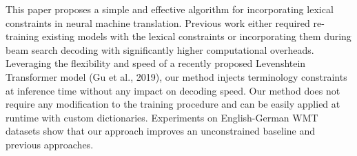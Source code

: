 This paper proposes a simple and effective algorithm for incorporating lexical constraints in neural machine translation. Previous work either required re-training existing models with the lexical constraints or incorporating them during beam search decoding with significantly higher computational overheads. Leveraging the flexibility and speed of a recently proposed Levenshtein Transformer model (Gu et al., 2019), our method injects terminology constraints at inference time without any impact on decoding speed. Our method does not require any modification to the training procedure and can be easily applied at runtime with custom dictionaries. Experiments on English-German WMT datasets show that our approach improves an unconstrained baseline and previous approaches.
